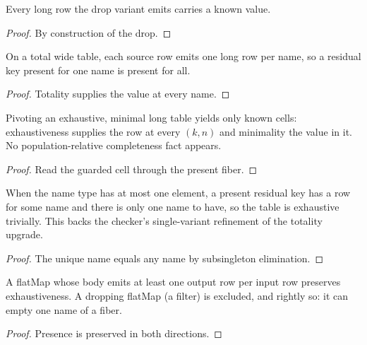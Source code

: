 \begin{theorem}
  \label{thm:unpivotdrop-minimal}\leanok
  Every long row the drop variant emits carries a known value.
\end{theorem}
\begin{proof}\leanok
  By construction of the drop.
\end{proof}

\begin{theorem}
  \label{thm:unpivotdrop-exhaustive}\leanok
  On a total wide table, each source row emits one long row per name, so
  a residual key present for one name is present for all.
\end{theorem}
\begin{proof}\leanok
  Totality supplies the value at every name.
\end{proof}

\begin{theorem}
  \label{thm:pivot-total}\leanok
  Pivoting an exhaustive, minimal long table yields only known cells:
  exhaustiveness supplies the row at every $(k, n)$ and minimality the
  value in it.  No population-relative completeness fact appears.
\end{theorem}
\begin{proof}\leanok
  Read the guarded cell through the present fiber.
\end{proof}

\begin{theorem}
  \label{thm:exhaustive-subsingleton}
  \leanok
  When the name type has at most one element, a present residual key has
  a row for some name and there is only one name to have, so the table is
  exhaustive trivially.  This backs the checker's single-variant
  refinement of the totality upgrade.
\end{theorem}
\begin{proof}\leanok
  The unique name equals any name by subsingleton elimination.
\end{proof}

\begin{theorem}
  \label{thm:flatMap-exhaustive}\leanok
  A flatMap whose body emits at least one output row per input row preserves
  exhaustiveness.  A dropping flatMap (a filter) is excluded, and rightly
  so: it can empty one name of a fiber.
\end{theorem}
\begin{proof}\leanok
  Presence is preserved in both directions.
\end{proof}

